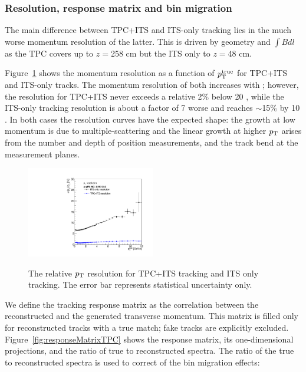 \FloatBarrier

\subsubsection{Resolution, response matrix and bin migration}
The main difference between TPC+ITS and ITS-only tracking lies in the much worse momentum resolution of the latter. This is driven by geometry 
and $\int Bdl$ as the TPC covers up to {$z=$258 cm} but the ITS only to {$z=$48 cm}. 

Figure~\ref{fig:resolution} shows the momentum resolution as a function of $p_{\mathrm{T}}^{\mathrm{true}}$ for 
TPC+ITS and ITS-only tracks. The momentum resolution of both increases with \pt; however, the resolution for TPC+ITS never exceeds a relative 2\% below 20 \GeVc, while the ITS-only tracking resolution is about a factor of 7 worse and reaches $\sim$15\% by 10 \GeVc. In both cases the resolution curves have the expected shape: the growth at low momentum is due to multiple-scattering and the linear growth at higher $p_{\mathrm{T}}$ arises from the number and depth of position measurements, and the track bend at the measurement planes. 
\begin{figure}[h]
\center
\includegraphics[width=0.5\textwidth]{Tracking/HybridAndITS_resolution_lowpt.pdf}\\
\caption{The relative $p_{\mathrm{T}}$ resolution for TPC+ITS tracking and ITS only tracking. The error bar represents statistical uncertainty only.}
\label{fig:resolution}
\end{figure}

We define the tracking response matrix as the correlation between the reconstructed and the generated transverse momentum. This matrix is filled only for reconstructed tracks with a true match; fake tracks are explicitly excluded. Figure~\ref{fig:responseMatrixTPC} shows the response matrix, its one-dimensional projections, and the ratio of true to reconstructed spectra. The ratio of the true to reconstructed spectra is used to correct of the bin migration effects:

